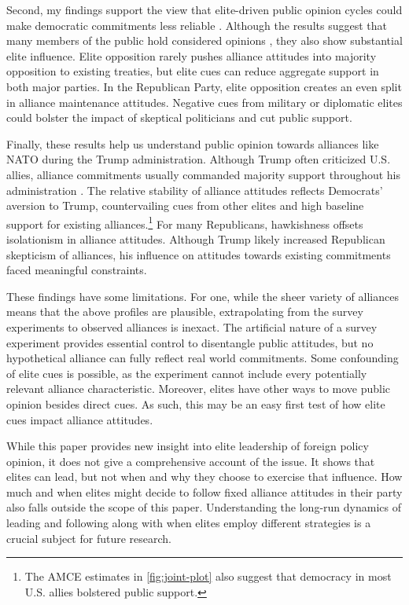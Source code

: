 \documentclass[12pt]{article}
\begin{document}
Second, my findings support the view that elite-driven public opinion cycles could make democratic commitments less reliable \citep{GartzkeGleditsch2004}. 
Although the results suggest that many members of the public hold considered opinions \citep{PageShapiro1992}, they also show substantial elite influence. 
Elite opposition rarely pushes alliance attitudes into majority opposition to existing treaties, but elite cues can reduce aggregate support in both major parties.
In the Republican Party, elite opposition creates an even split in alliance maintenance attitudes. 
Negative cues from military or diplomatic elites could bolster the impact of skeptical politicians and cut public support. 


Finally, these results help us understand public opinion towards alliances like NATO during the Trump administration.
Although Trump often criticized U.S. allies, alliance commitments usually commanded majority support throughout his administration \citep{PewNATO2020}. 
The relative stability of alliance attitudes reflects Democrats' aversion to Trump, countervailing cues from other elites and high baseline support for existing alliances.\footnote{The AMCE estimates in \autoref{fig:joint-plot} also suggest that democracy in most U.S. allies bolstered public support.}
For many Republicans, hawkishness offsets isolationism in alliance attitudes.
Although Trump likely increased Republican skepticism of alliances, his influence on attitudes towards existing commitments faced meaningful constraints. 


These findings have some limitations. 
For one, while the sheer variety of alliances means that the above profiles are plausible, extrapolating from the survey experiments to observed alliances is inexact. 
The artificial nature of a survey experiment provides essential control to disentangle public attitudes, but no hypothetical alliance can fully reflect real world commitments.
Some confounding of elite cues is possible, as the experiment cannot include every potentially relevant alliance characteristic. 
Moreover, elites have other ways to move public opinion besides direct cues.
As such, this may be an easy first test of how elite cues impact alliance attitudes. 


While this paper provides new insight into elite leadership of foreign policy opinion, it does not give a comprehensive account of the issue.
It shows that elites can lead, but not when and why they choose to exercise that influence. 
How much and when elites might decide to follow fixed alliance attitudes in their party also falls outside the scope of this paper. 
Understanding the long-run dynamics of leading and following along with when elites employ different strategies is a crucial subject for future research. 
\end{document}
